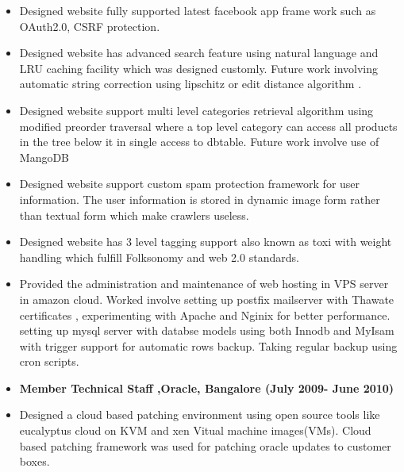 \documentclass[]{res}
\begin{document}
\begin{description}
\begin{itemize}
 
\item{ Designed  website fully supported latest facebook app frame work such as OAuth2.0, CSRF protection.}
 
\item{ Designed website has advanced search feature using natural language and LRU  caching facility which was designed customly. Future work involving automatic string correction using lipschitz  or edit distance algorithm .  }
 
\item{ Designed website support  multi level categories  retrieval  algorithm using  modified preorder traversal where a top level category can access all products in the tree below it in single access to dbtable. Future work involve use of  MangoDB}

\item{ Designed website support custom spam protection framework for user information. The user information is stored in dynamic image form rather than textual form which make crawlers useless. }
 
\item{ Designed website has 3 level tagging support also known as toxi with weight handling which fulfill Folksonomy and web 2.0 standards. }
 
\item  Provided the  administration and maintenance of web hosting in VPS server in amazon cloud. Worked involve setting up postfix mailserver with Thawate certificates , experimenting  with Apache and Nginix for better performance. setting up mysql server with databse models using both Innodb and MyIsam with trigger support for automatic rows backup. Taking regular backup using cron scripts. 


\end {itemize}


\item[]
\begin{itemize}
\item {\textbf{ Member Technical Staff ,Oracle, Bangalore    (July 2009- June 2010)}}\\

\item Designed a cloud based patching environment using open source tools like eucalyptus cloud on KVM and xen Vitual machine images(VMs). Cloud based patching framework was used for patching oracle updates to customer boxes.




\end{itemize}
\end{description}
\end{document}
